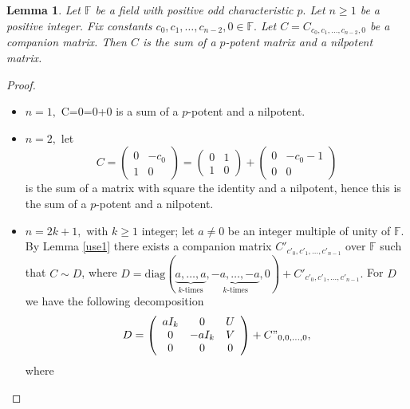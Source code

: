 \documentclass[11pt]{amsart}
\newtheorem{lem}[thm]{Lemma}
\theoremstyle{definition}
\numberwithin{equation}{section}
\newcommand{\diag}{\mathrm{diag}}
\newcommand{\F}{\mathbb{F}}
\begin{document}
\begin{lem}\label{traceless}
Let $\F$ be a field with positive odd characteristic $p.$ Let $n\geq 1$ be a positive integer. Fix constants $c_0, c_1,\dots,c_{n-2},0\in \F.$
Let $C=C_{c_0,c_1,\ldots,c_{n-2},0}$ be a companion matrix. Then $C$ is the sum of a $p$-potent matrix and a nilpotent matrix.
\end{lem}
\begin{proof}

\begin{itemize}
\item $n=1,$ C=0=0+0 is a sum of a $p$-potent and a nilpotent.
\item $n=2,$ let $$C=\left(\begin{array}{cc}
0 & -c_0 \\
1 & 0
\end{array}\right)=\left(\begin{array}{cc}
0 & 1 \\
1 & 0
\end{array}\right)+\left(\begin{array}{cc}
0 & -c_0-1 \\
0 & 0
\end{array}\right)$$ is the sum of a matrix with square the identity and a nilpotent, hence this is the sum of a $p$-potent and a nilpotent.
\item $n=2k+1,$ with $k\geq 1$ integer; let $a\neq 0$ be an integer multiple of unity of $\F.$ By Lemma \ref{use1} there exists a companion matrix $C'_{c'_0,c'_1,\ldots,c'_{n-1}}$ over $\F$ such that $C\sim D$, where $D=\diag (\underbrace{a,\dots,a }_{k \textrm{-times}} ,\underbrace{-a,\dots,-a }_{k \textrm{-times}} ,0)+C'_{c'_0,c'_1,\ldots,c'_{n-1}}.$
    For $D$ we have the following decomposition
    $$D=\left(\begin{array}{ccc}
aI_k & 0 & U \\
0 & -aI_k & V\\
0 & 0 & 0
\end{array}\right)+C"_{0,0,\dots,0},$$ where



\end{itemize}
\end{proof}
\end{document}
